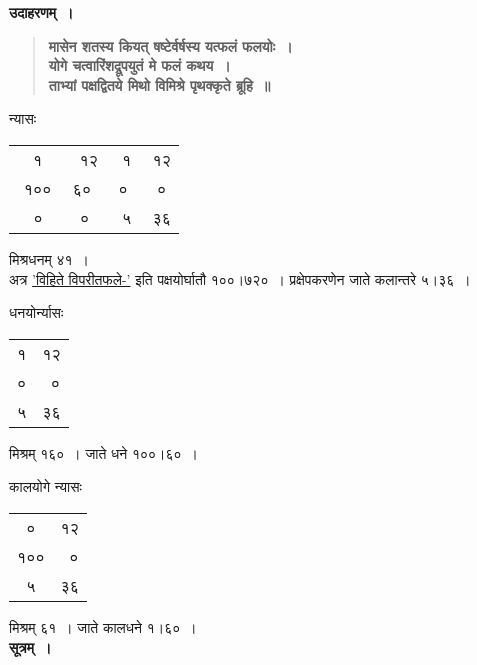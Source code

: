 \documentclass[11pt, openany]{book}
\begin{document}
\noindent \textbf{उदाहरणम्~।}

 \label{Ex 2.17}
\begin{quote}
\textbf{{\color{red}मासेन शतस्य कियत् षष्टेर्वर्षस्य यत्फलं फलयोः~।\\
योगे चत्वारिंशद्रूपयुतं मे फलं कथय~। \\
ताभ्यां पक्षद्वितये मिथो विमिश्रे पृथक्कृते ब्रूहि~॥}}
\end{quote}

न्यासः \begin{small}\begin{tabular}{c|c|}
~~१~~ ~~१२ & ~१ ~~१२ \\
१००~~ ६० & ०~~~ ० \\
~०~~~~ ० & ~५~~ ३६
\end{tabular}\end{small}\; मिश्रधनम् ४१~।\\

अत्र \hyperref[2.5]{'विहिते विपरीतफले-'} इति पक्षयोर्घातौ १००।७२०~। प्रक्षेपकरणेन जाते कलान्तरे ५।३६~।

\newpage

धनयोर्न्यासः \begin{small}\begin{tabular}{c|c}
१ & १२ \\
० & ~० \\
५ & ३६
\end{tabular}\end{small}\; मिश्रम् १६०~। जाते धने १००।६०~।\\
\vspace{2mm}

कालयोगे न्यासः \begin{small}\begin{tabular}{c|c}
~०~ & १२ \\
१०० & ~० \\
~५~ & ३६
\end{tabular}\end{small}\; मिश्रम् ६१~। जाते कालधने १।६०~।\\

\noindent \textbf{सूत्रम्~।}
\end{document}

